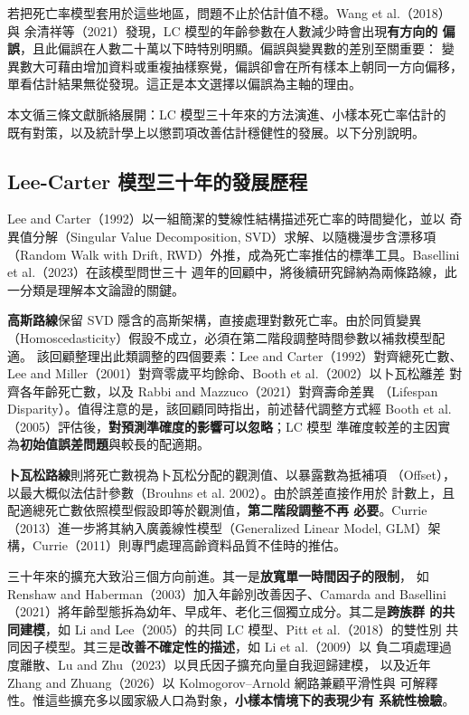 \documentclass[UTF8, fontset=macnew, a4paper, 12pt]{ctexart}
\begin{document}
若把死亡率模型套用於這些地區，問題不止於估計值不穩。Wang et al.（2018）與
余清祥等（2021）發現，LC 模型的年齡參數在人數減少時會出現\textbf{有方向的
偏誤}，且此偏誤在人數二十萬以下時特別明顯。偏誤與變異數的差別至關重要：
變異數大可藉由增加資料或重複抽樣察覺，偏誤卻會在所有樣本上朝同一方向偏移，
單看估計結果無從發現。這正是本文選擇以偏誤為主軸的理由。

本文循三條文獻脈絡展開：LC 模型三十年來的方法演進、小樣本死亡率估計的
既有對策，以及統計學上以懲罰項改善估計穩健性的發展。以下分別說明。

\subsection{Lee-Carter 模型三十年的發展歷程}

Lee and Carter（1992）以一組簡潔的雙線性結構描述死亡率的時間變化，並以
奇異值分解（Singular Value Decomposition, SVD）求解、以隨機漫步含漂移項
（Random Walk with Drift, RWD）外推，成為死亡率推估的標準工具。Basellini et al.（2023）在該模型問世三十
週年的回顧中，將後續研究歸納為兩條路線，此一分類是理解本文論證的關鍵。

\textbf{高斯路線}保留 SVD 隱含的高斯架構，直接處理對數死亡率。由於同質變異
（Homoscedasticity）假設不成立，必須在第二階段調整時間參數以補救模型配適。
該回顧整理出此類調整的四個要素：Lee and Carter（1992）對齊總死亡數、
Lee and Miller（2001）對齊零歲平均餘命、Booth et al.（2002）以卜瓦松離差
對齊各年齡死亡數，以及 Rabbi and Mazzuco（2021）對齊壽命差異
（Lifespan Disparity）。值得注意的是，該回顧同時指出，前述替代調整方式經
Booth et al.（2005）評估後，\textbf{對預測準確度的影響可以忽略}；LC 模型
準確度較差的主因實為\textbf{初始值誤差問題}與較長的配適期。

\textbf{卜瓦松路線}則將死亡數視為卜瓦松分配的觀測值、以暴露數為抵補項
（Offset），以最大概似法估計參數（Brouhns et al. 2002）。由於誤差直接作用於
計數上，且配適總死亡數依照模型假設即等於觀測值，\textbf{第二階段調整不再
必要}。Currie（2013）進一步將其納入廣義線性模型（Generalized Linear Model,
GLM）架構，Currie（2011）則專門處理高齡資料品質不佳時的推估。

三十年來的擴充大致沿三個方向前進。其一是\textbf{放寬單一時間因子的限制}，
如 Renshaw and Haberman（2003）加入年齡別改善因子、Camarda and Basellini
（2021）將年齡型態拆為幼年、早成年、老化三個獨立成分。其二是\textbf{跨族群
的共同建模}，如 Li and Lee（2005）的共同 LC 模型、Pitt et al.（2018）的雙性別
共同因子模型。其三是\textbf{改善不確定性的描述}，如 Li et al.（2009）以
負二項處理過度離散、Lu and Zhu（2023）以貝氏因子擴充向量自我迴歸建模，
以及近年 Zhang and Zhuang（2026）以 Kolmogorov--Arnold 網路兼顧平滑性與
可解釋性。惟這些擴充多以國家級人口為對象，\textbf{小樣本情境下的表現少有
系統性檢驗}。
\end{document}
